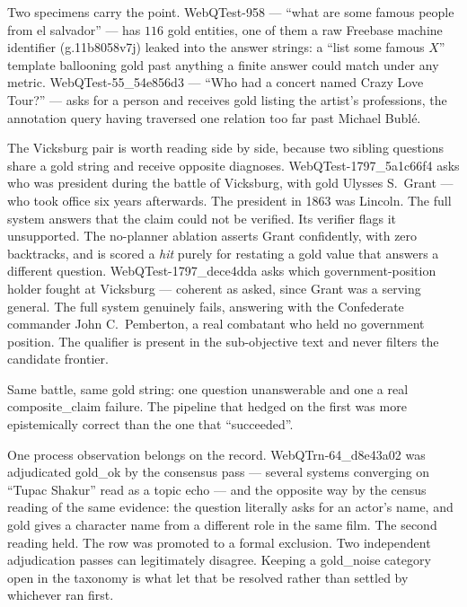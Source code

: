 Two specimens carry the point. \textsf{WebQTest-958} --- ``what are some famous
people from el salvador'' --- has $116$ gold entities, one of them a raw
Freebase machine identifier (\textsf{g.11b8058v7j}) leaked into the answer
strings: a ``list some famous $X$'' template ballooning gold past anything a
finite answer could match under any metric. \textsf{WebQTest-55\_54e856d3} ---
``Who had a concert named Crazy Love Tour?'' --- asks for a person and receives
gold listing the artist's professions, the annotation query having traversed one
relation too far past Michael Bublé.

The Vicksburg pair is worth reading side by side, because two sibling questions
share a gold string and receive opposite diagnoses.
\textsf{WebQTest-1797\_5a1c66f4} asks who was president during the battle of
Vicksburg, with gold \textsf{Ulysses S.~Grant} --- who took office six years
afterwards. The president in 1863 was Lincoln. The full system answers that the
claim could not be verified. Its verifier flags it \textsf{unsupported}. The
no-planner ablation asserts Grant confidently, with zero backtracks, and is
scored a \emph{hit} purely for restating a gold value that answers a different
question. \textsf{WebQTest-1797\_dece4dda} asks which government-position holder
fought at Vicksburg --- coherent as asked, since Grant was a serving general.
The full system genuinely fails, answering with the Confederate commander
John C.~Pemberton, a real combatant who held no government position. The
qualifier is present in the sub-objective text and never filters the candidate
frontier.

Same battle, same gold string: one question unanswerable and one a real
\textsf{composite\_claim} failure. The pipeline that hedged on the first was
more epistemically correct than the one that ``succeeded''.

One process observation belongs on the record. \textsf{WebQTrn-64\_d8e43a02} was
adjudicated \textsf{gold\_ok} by the consensus pass --- several systems
converging on ``Tupac Shakur'' read as a topic echo --- and the opposite way by
the census reading of the same evidence: the question literally asks for an
actor's name, and gold gives a character name from a different role in the same
film. The second reading held. The row was promoted to a formal exclusion.
Two independent adjudication passes can legitimately disagree. Keeping a
\textsf{gold\_noise} category open in the taxonomy is what let that be resolved
rather than settled by whichever ran first.

